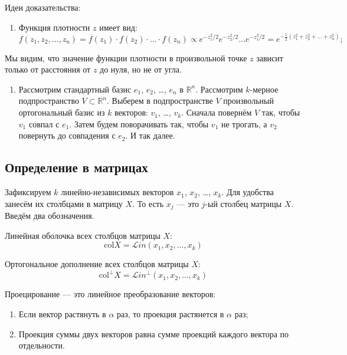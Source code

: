 \documentclass[11pt,russian,]{article}
\providecommand{\tightlist}{%
  \setlength{\itemsep}{0pt}\setlength{\parskip}{0pt}}
\newcommand{\RR}{\mathbb{R}}
\renewcommand{\Rn}{\RR^n}
\newcommand{\1}{\mathbbm{1}}
\newcommand{\Lin}{\mathcal{L}in}
\newcommand{\Linp}{\Lin^{\perp}}
\newcommand{\col}{\mathcal{col}}
\newcommand{\colp}{\col^{\perp}}
\renewcommand{\col}{\mathrm{col}}
\begin{document}
Идеи доказательства:

\begin{enumerate}
\def\labelenumi{\arabic{enumi}.}
\tightlist
\item
  Функция плотности \(z\) имеет вид: \[
  f(z_1, z_2, \ldots, z_n) = f(z_1) \cdot f(z_2)\cdot \ldots \cdot f(z_n) \propto e^{-z_1^2/2}e^{-z_2^2/2}\ldots e^{-z_1^2/2} = e^{-\frac{1}{2}(z_1^2 + z_2^2 +\ldots +z_n^2)};
  \]
\end{enumerate}

Мы видим, что значение функции плотности в произвольной точке \(z\)
зависит только от расстояния от \(z\) до нуля, но не от угла.

\begin{enumerate}
\def\labelenumi{\arabic{enumi}.}
\setcounter{enumi}{1}
\tightlist
\item
  Рассмотрим стандартный базис \(e_1\), \(e_2\), \ldots, \(e_n\) в
  \(\Rn\). Рассмотрим \(k\)-мерное подпространство \(V \subset \Rn\).
  Выберем в подпространстве \(V\) произвольный ортогональный базис из
  \(k\) векторов: \(v_1\), \ldots, \(v_k\). Сначала повернём \(V\) так,
  чтобы \(v_1\) совпал с \(e_1\). Затем будем поворачивать так, чтобы
  \(v_1\) не трогать, а \(v_2\) повернуть до совпадения с \(e_2\). И так
  далее.
\end{enumerate}

\subsection{Определение в матрицах}\label{--}

Зафиксируем \(k\) линейно-независимых векторов \(x_1\), \(x_2\), \ldots,
\(x_k\). Для удобства занесём их столбцами в матрицу \(X\). То есть
\(x_j\) --- это \(j\)-ый столбец матрицы \(X\). Введём два обозначения.

Линейная оболочка всех столбцов матрицы \(X\): \[
\col X = \Lin(x_1, x_2, \ldots, x_k)
\]

Ортогональное дополнение всех столбцов матрицы \(X\): \[
\colp X = \Linp(x_1, x_2, \ldots, x_k)
\]

Проецирование --- это линейное преобразование векторов:

\begin{enumerate}
\def\labelenumi{\arabic{enumi}.}
\item
  Если вектор растянуть в \(\alpha\) раз, то проекция растянется в
  \(\alpha\) раз;
\item
  Проекция суммы двух векторов равна сумме проекций каждого вектора по
  отдельности.
\end{enumerate}
\end{document}
